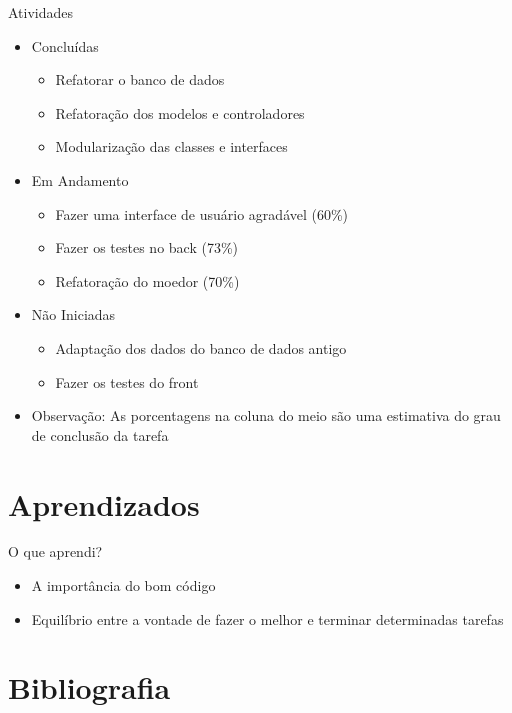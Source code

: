 \documentclass[aspectratio=43,display]{beamer}
\begin{document}
  \begin{frame}{Atividades}
    \begin{itemize}
      \item Concluídas
      \begin{itemize}
        \item Refatorar o banco de dados \pause
        \item Refatoração dos modelos e controladores \pause
        \item Modularização das classes e interfaces \pause
      \end{itemize}
      \item Em Andamento
      \begin{itemize}
        \item Fazer uma interface de usuário agradável (60\%) \pause
        \item Fazer os testes no back (73\%) \pause
        \item Refatoração do moedor (70\%) \pause
      \end{itemize}
      \item Não Iniciadas
      \begin{itemize}
        \item Adaptação dos dados do banco de dados antigo \pause
        \item Fazer os testes do front \pause
      \end{itemize}
      \item Observação: As porcentagens na coluna do meio são uma estimativa do grau de conclusão da tarefa
    \end{itemize}
  \end{frame}

  \section{Aprendizados}\label{sec:aprendizados}

  \begin{frame}{O que aprendi?}
    \begin{itemize}
      \item A importância do bom código \pause
      \item Equilíbrio entre a vontade de fazer o melhor e terminar determinadas tarefas
    \end{itemize}
  \end{frame}

  \section{Bibliografia}\label{sec:bibliografia}
\end{document}
